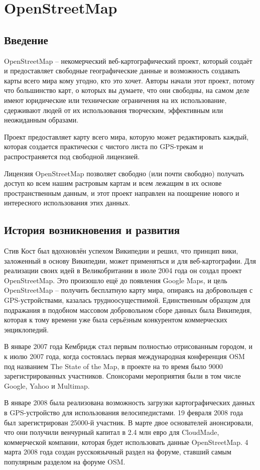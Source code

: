 \section{OpenStreetMap}
\subsection{Введение}
OpenStreetMap -- некомерческий веб-картографический проект, который создаёт и 
предоставляет свободные географические данные и возможность создавать карты 
всего мира кому угодно, кто это хочет. Авторы начали этот проект, потому что 
большинство карт, о которых вы думаете, что они свободны, на самом деле имеют 
юридические или технические ограничения на их использование, сдерживают людей 
от их использования творческим, эффективным или неожиданным образами. 

Проект предоставляет карту всего мира, которую может редактировать каждый, 
которая создается практически с чистого листа по GPS-трекам и распространяется 
под свободной лицензией.

Лицензия OpenStreetMap позволяет свободно (или почти свободно) получать доступ 
ко всем нашим растровым картам и всем лежащим в их основе пространственным 
данным, и этот проект направлен на поощрение нового и интересного 
использования этих данных.\cite{osmwiki}

\subsection{История возникновения и развития}
Стив Кост был вдохновлён успехом Википедии и решил, что принцип вики, 
заложенный в основу Википедии, может применяться и для веб-картографии. Для 
реализации своих идей в Великобритании в июле 2004 года он создал проект 
OpenStreetMap. Это произошло ещё до появления Google Maps, и цель 
OpenStreetMap -- получить бесплатную карту мира, опираясь на добровольцев с 
GPS-устройствами, казалась трудноосуществимой. Единственным образцом для 
подражания в подобном массовом добровольном сборе данных была Википедия, 
которая к тому времени уже была серьёзным конкурентом коммерческих 
энциклопедий.

В январе 2007 года Кембридж стал первым полностью отрисованным городом, и к 
июлю 2007 года, когда состоялась первая международная конференция OSM под 
названием The State of the Map, в проекте на то время было 9000 
зарегистрированных участников. Спонсорами мероприятия были в том числе Google, 
Yahoo и Multimap.

В январе 2008 была реализована возможность загрузки картографических данных в 
GPS-устройство для использования велосипедистами. 19 февраля 2008 года был 
зарегистрирован 25000-й участник. В марте двое основателей анонсировали, что 
они получили венчурный капитал в 2.4 млн евро для CloudMade, коммерческой 
компании, которая будет использовать данные OpenStreetMap. 4 марта 2008 года 
создан русскоязычный раздел на форуме, ставший самым популярным разделом на 
форуме OSM.

